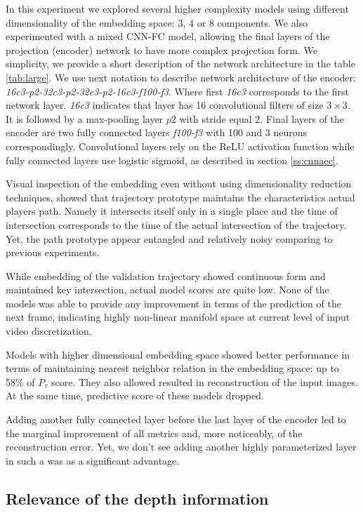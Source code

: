 In this experiment we explored several higher complexity models using different dimensionality of the embedding space: 3, 4 or 8 components. We also experimented with a mixed CNN-FC model, allowing the final layers of the projection (encoder) network to have more complex projection form. We simplicity, we provide a short description of the network architecture in the table \ref{tab:large}. We use next notation to describe network architecture of the encoder: \textit{16c3-p2-32c3-p2-32c3-p2-16c3-f100-f3}. Where first \textit{16c3} corresponds to the first network layer.  \textit{16c3} indicates that layer has 16 convolutional filters of size $3 \times 3$. It is followed by a max-pooling layer $p2$ with stride equal 2. Final layers of the encoder are two fully connected layers  \textit{f100-f3} with 100 and 3 neurons correspondingly. Convolutional layers rely on the ReLU activation function while fully connected layers use logistic sigmoid, as described in section \ref{ss:cnnaec}.

Visual inspection of the embedding even without using dimensionality reduction techniques, showed that trajectory prototype maintains the characteristics actual players path. Namely it intersects itself only in a single place and the time of intersection corresponds to the time of the actual intersection of the trajectory. Yet, the path prototype appear entangled and relatively noisy comparing to previous experiments.

While embedding of the validation trajectory showed continuous form and maintained key intersection, actual model scores are quite low. None of the models was able to provide any improvement in terms of the prediction of the next frame, indicating highly non-linear manifold space at current level of input video discretization.

Models with higher dimensional embedding space showed better performance in terms of maintaining nearest neighbor relation in the embedding space: up to 58\% of $P_{\tau}$ score. They also allowed resulted in reconstruction of the input images. At the same time, predictive score of these models dropped.

Adding another fully connected layer before the last layer of the encoder led to the marginal improvement of all metrics and, more noticeably, of the reconstruction error. Yet, we don't see adding another highly parameterized layer in such a was as a significant advantage.


\subsection{Relevance of the depth information}

